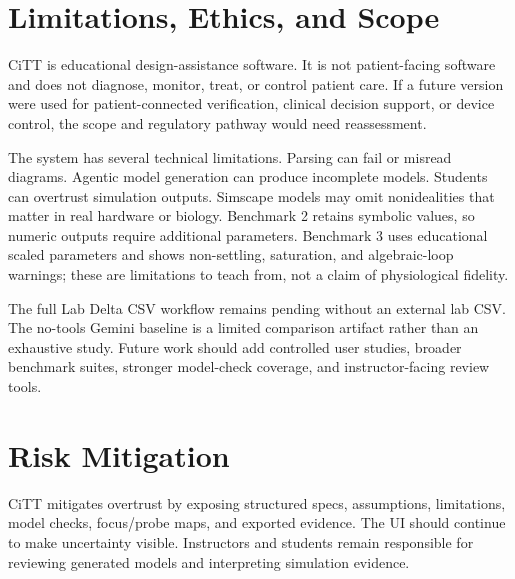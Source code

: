 \section{Limitations, Ethics, and Scope}

CiTT is educational design-assistance software. It is not patient-facing software and does not diagnose, monitor, treat, or control patient care. If a future version were used for patient-connected verification, clinical decision support, or device control, the scope and regulatory pathway would need reassessment.

The system has several technical limitations. Parsing can fail or misread diagrams. Agentic model generation can produce incomplete models. Students can overtrust simulation outputs. Simscape models may omit nonidealities that matter in real hardware or biology. Benchmark 2 retains symbolic values, so numeric outputs require additional parameters. Benchmark 3 uses educational scaled parameters and shows non-settling, saturation, and algebraic-loop warnings; these are limitations to teach from, not a claim of physiological fidelity.

The full Lab Delta CSV workflow remains pending without an external lab CSV. The no-tools Gemini baseline is a limited comparison artifact rather than an exhaustive study. Future work should add controlled user studies, broader benchmark suites, stronger model-check coverage, and instructor-facing review tools.

\section{Risk Mitigation}

CiTT mitigates overtrust by exposing structured specs, assumptions, limitations, model checks, focus/probe maps, and exported evidence. The UI should continue to make uncertainty visible. Instructors and students remain responsible for reviewing generated models and interpreting simulation evidence.
